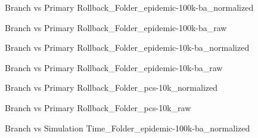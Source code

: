 \vspace{1cm}
\newpage
\begin{figure}[H]
\centering

\caption{Branch vs Primary Rollback\_Folder\_epidemic-100k-ba\_normalized}
\end{figure}
\vspace{1cm}
\begin{figure}[H]
\centering

\caption{Branch vs Primary Rollback\_Folder\_epidemic-100k-ba\_raw}
\end{figure}
\vspace{1cm}
\newpage
\begin{figure}[H]
\centering

\caption{Branch vs Primary Rollback\_Folder\_epidemic-10k-ba\_normalized}
\end{figure}
\vspace{1cm}
\begin{figure}[H]
\centering

\caption{Branch vs Primary Rollback\_Folder\_epidemic-10k-ba\_raw}
\end{figure}
\vspace{1cm}
\newpage
\begin{figure}[H]
\centering

\caption{Branch vs Primary Rollback\_Folder\_pcs-10k\_normalized}
\end{figure}
\vspace{1cm}
\begin{figure}[H]
\centering

\caption{Branch vs Primary Rollback\_Folder\_pcs-10k\_raw}
\end{figure}
\vspace{1cm}
\newpage
\begin{figure}[H]
\centering

\caption{Branch vs Simulation Time\_Folder\_epidemic-100k-ba\_normalized}
\end{figure}
